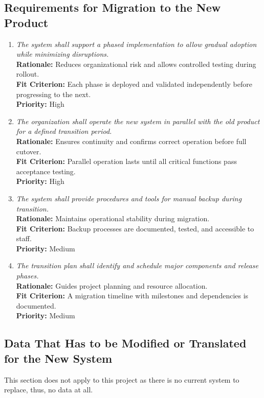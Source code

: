 \documentclass[12pt]{article}
\begin{document}
\subsection{Requirements for Migration to the New Product}
\begin{enumerate}[label=MNP-RMNP  \arabic*., wide=0pt, leftmargin=*]
  \item \emph{The system shall support a
      phased implementation to allow gradual adoption while minimizing
    disruptions.}\\
    \textbf{Rationale:} Reduces organizational risk and allows
    controlled testing during rollout.\\
    \textbf{Fit Criterion:} Each phase is deployed and validated
    independently before progressing to the next.\\
    \textbf{Priority:} High

  \item \emph{The organization shall operate
      the new system in parallel with the old product for a defined
    transition period.}\\
    \textbf{Rationale:} Ensures continuity and confirms correct
    operation before full cutover.\\
    \textbf{Fit Criterion:} Parallel operation lasts until all
    critical functions pass acceptance testing.\\
    \textbf{Priority:} High

  \item \emph{The system shall provide
    procedures and tools for manual backup during transition.}\\
    \textbf{Rationale:} Maintains operational stability during migration.\\
    \textbf{Fit Criterion:} Backup processes are documented, tested,
    and accessible to staff.\\
    \textbf{Priority:} Medium

  \item \emph{The transition plan shall
    identify and schedule major components and release phases.}\\
    \textbf{Rationale:} Guides project planning and resource allocation.\\
    \textbf{Fit Criterion:} A migration timeline with milestones and
    dependencies is documented.\\
    \textbf{Priority:} Medium
\end{enumerate}

\subsection{Data That Has to be Modified or Translated for the New System}
This section does not apply to this project as there is no current
system to replace, thus, no data at all.
\end{document}
